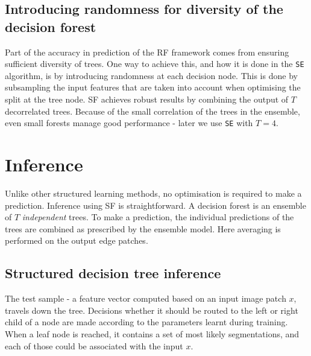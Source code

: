 \subsection{Introducing randomness for diversity of the decision forest}
Part of the accuracy in prediction of the RF framework comes from ensuring sufficient diversity of trees. One way to achieve this, and how it is done in the {\tt SE} algorithm, is by introducing randomness at each decision node. This is done by subsampling the input features that are taken into account when optimising the split at the tree node. SF achieves robust results by combining the output of $T$ decorrelated trees. Because of the small correlation of the trees in the ensemble, even small forests manage good performance - later we use {\tt SE} with $T=4$.

\section{Inference}
Unlike other structured learning methods, no optimisation is required to make a prediction. Inference using SF is straightforward. A decision forest is an ensemble of $T$ \textit{independent} trees. To make a prediction, the individual predictions of the trees are combined as prescribed by the ensemble model. Here averaging is performed on the output edge patches.

\subsection{Structured decision tree inference}
The test sample - a feature vector computed based on an input image patch $x$, travels down the tree. Decisions whether it should be routed to the left or right child of a node are made according to the parameters learnt during training. When a leaf node is reached, it contains a set of most likely segmentations, and each of those could be associated with the input $x$.

